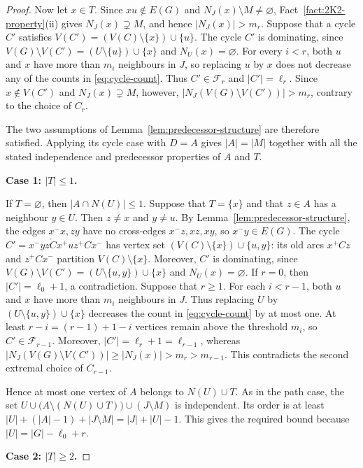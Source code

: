 \documentclass[11pt]{article}
\numberwithin{equation}{section}
\theoremstyle{plain}
\theoremstyle{definition}
\theoremstyle{plain}
\begin{document}
\begin{proof}
Now let $x\in T$. Since $xu\notin E(G)$ and
$N_J(x)\setminus M\neq\varnothing$,
Fact~\ref{fact:2K2-property}\textup{(ii)} gives
    $N_J(x)\supsetneq M$,
and hence $|N_J(x)|>m_r$.
Suppose that a cycle $C'$ satisfies
   $ V(C')=(V(C)\setminus\{x\})\cup\{u\}$.
The cycle $C'$ is dominating, since
$V(G)\setminus V(C')=(U\setminus\{u\})\cup\{x\}$
and $N_U(x)=\varnothing$.
For every $i<r$, both $u$ and $x$ have more than $m_i$
neighbours in $J$, so replacing $u$ by $x$ does not decrease
any of the counts in \eqref{eq:cycle-count}.
Thus $C'\in\mathcal F_r$ and $|C'|=\ell_r$.
Since $x\notin V(C')$ and $N_J(x)\supsetneq M$, however,
    $|N_J(V(G)\setminus V(C'))|>m_r$,
contrary to the choice of $C_r$.

The two assumptions of
Lemma~\ref{lem:predecessor-structure} are therefore satisfied.
Applying its cycle case with $D=A$ gives
$|A|=|M|$ together with all the stated independence and
predecessor properties of $A$ and $T$.

\medskip
\noindent
\textbf{Case 1: $|T|\leq1$.}

If $T=\varnothing$, then $|A\cap N(U)|\leq1$.
Suppose that $T=\{x\}$ and that $z\in A$ has a neighbour
$y\in U$. Then $z\neq x$ and $y\neq u$.
By Lemma~\ref{lem:predecessor-structure}, the edges $x^-x,zy$
have no cross-edges $x^-z,xz,xy$, so $x^-y\in E(G)$.
The cycle
 $   C'=x^-yz\overleftarrow C x^+uz^+C x^-$
has vertex set $(V(C)\setminus\{x\})\cup\{u,y\}$:
its old arcs $x^+Cz$ and $z^+Cx^-$ partition $V(C)\setminus\{x\}$.
Moreover, $C'$ is dominating, since
$V(G)\setminus V(C')=(U\setminus\{u,y\})\cup\{x\}$
and $N_U(x)=\varnothing$.
If $r=0$, then $|C'|=\ell_0+1$, a contradiction.
Suppose that $r\ge1$. For each $i<r-1$, both $u$ and $x$ have
more than $m_i$ neighbours in $J$. Thus replacing $U$ by
$(U\setminus\{u,y\})\cup\{x\}$ decreases the count in \eqref{eq:cycle-count}
by at most one. At least $r-i=(r-1)+1-i$ vertices remain above
the threshold $m_i$, so $C'\in\mathcal F_{r-1}$.
Moreover, $|C'|=\ell_r+1=\ell_{r-1}$, whereas
 $|N_J(V(G)\setminus V(C'))|
 \ge |N_J(x)|>m_r>m_{r-1}$.
This contradicts the second extremal choice of $C_{r-1}$.

Hence at most one vertex of $A$ belongs to $N(U)\cup T$.
As in the path case, the set
$U\cup\bigl(A\setminus(N(U)\cup T)\bigr)\cup(J\setminus M)$
is independent. Its order is at least
$|U|+(|A|-1)+|J\setminus M|=|J|+|U|-1$.
This gives the required bound because $|U|=|G|-\ell_0+r$.

\medskip
\noindent
\textbf{Case 2: $|T|\geq2$.}


\end{proof}
\end{document}
